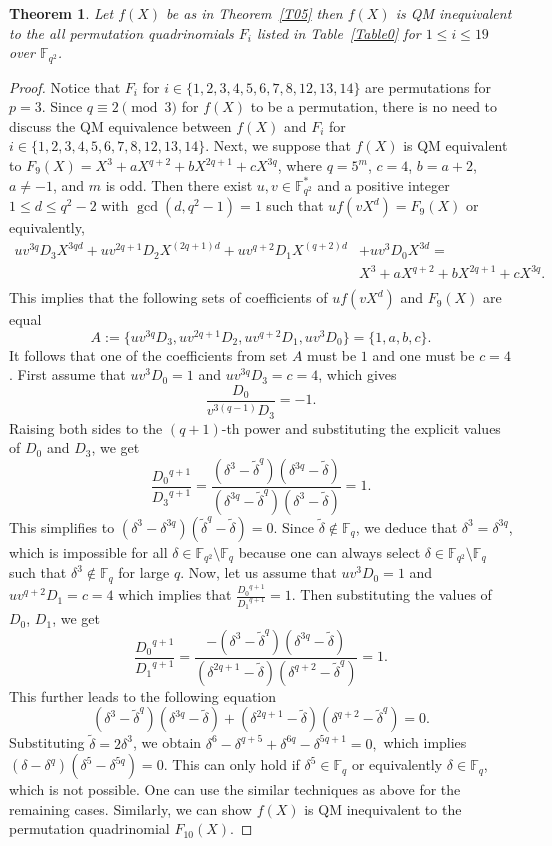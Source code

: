 \documentclass[12pt]{amsart}
\newtheorem{thm}{Theorem}[section]
\numberwithin{equation}{section}
\theoremstyle{definition}
\newcommand{\F}{\mathbb F}
\begin{document}
\begin{thm}\label{quadeq1}
Let $f(X)$ be as in Theorem~\ref{T05} then $f(X)$ is QM inequivalent to the all permutation quadrinomials $F_i$ listed in Table~\ref{Table0} for $1 \leq i \leq 19$ over $\F_{q^2}$.
\end{thm}
\begin{proof}
Notice that $F_i$ for $i \in \{1,2,3,4,5,6,7,8,12,13,14 \}$ are permutations for $p=3$. Since $q \equiv 2 \pmod 3$ for $f(X)$ to be a permutation, there is no need to discuss the QM equivalence between $f(X)$ and $F_i$ for $i \in \{1,2,3,4,5,6,7,8,12,13,14 \}$. Next, we suppose that $f(X)$ is QM equivalent to $F_9(X)=X^3 + aX^{q+2} + bX^{2q+1} + cX^{3q}$, where $q = 5^m$, $c = 4$, $b = a+2$, $a \neq -1$, and $m$ is odd. Then there exist $u, v \in \mathbb{F}_{q^2}^{*}$ and a positive integer $1 \leq d \leq q^2 - 2$ with $\gcd(d, q^2 - 1) = 1$ such that
$uf(vX^d) = F_9(X)$
or equivalently,
\begin{align*}
 uv^{3q}D_3X^{3qd} + uv^{2q+1}D_2X^{(2q+1)d} + uv^{q+2}D_1X^{(q+2)d}&  + uv^3 D_0X^{3d} = \\
& X^3 + aX^{q+2} + bX^{2q+1} + cX^{3q}.\\
\end{align*}
This implies that the following sets of coefficients of $uf(vX^d)$ and $F_9(X)$ are equal
\[
    A := \{uv^{3q}D_3, uv^{2q+1}D_2, uv^{q+2}D_1, uv^3 D_0\} = \{1, a, b, c\} .
\]
It follows that one of the coefficients from set $A$ must be $1$ and one must be $c=4$. First assume that $uv^3 D_0 = 1$ and $uv^{3q}D_3 = c = 4$, which gives
\[
    \frac{D_0}{v^{3(q-1)}D_3} = -1.
\]
Raising both sides to the $(q+1)$-th power and substituting the explicit values of $D_0$ and $D_3$, we get
\[
    \frac{{D_0}^{q+1}}{{D_3}^{q+1}} = \frac{(\delta^3 - \tilde{\delta}^q)(\delta^{3q} - \tilde{\delta})}{(\delta^{3q} - \tilde{\delta}^q)(\delta^3 - \tilde{\delta})}  = 1.
\]
This simplifies to $(\delta^3 - \delta^{3q})(\tilde{\delta}^q - \tilde{\delta}) = 0$. Since $\tilde{\delta} \notin \mathbb{F}_q$, we deduce that $\delta^3 = \delta^{3q}$, which is impossible for all $\delta \in \mathbb{F}_{q^2} \setminus \mathbb{F}_q$ because one can always select $\delta \in \mathbb{F}_{q^2} \setminus \mathbb{F}_q$ such that $\delta^3 \notin \mathbb{F}_q$ for large $q$. Now, let us assume that $uv^3 D_0=1$ and $uv^{q+2}D_1=c=4$ which implies that $\frac{{D_0}^{q+1}}{{D_1}^{q+1}}=1$. Then substituting the values of $D_0$, $D_1$, we get
 \[
 \frac{{D_0}^{q+1}}{{D_1}^{q+1}}=\dfrac{-(\delta^{3}-{\tilde \delta}^q)(\delta^{3q}-{\tilde \delta})}{(\delta^{2q+1}-{\tilde \delta})(\delta^{q+2}-{\tilde \delta}^q)}=1.
 \]
This further leads to the following equation
 \[
 (\delta^{3}-{\tilde \delta}^q)(\delta^{3q}-{\tilde \delta})+(\delta^{2q+1}-{\tilde \delta})(\delta^{q+2}-{\tilde \delta}^q)=0.
 \]
Substituting  ${\tilde \delta}=2\delta^3$, we obtain
 \(
 \delta^6-\delta^{q+5}+\delta^{6q}-\delta^{5q+1}=0,
 \)
 which implies $(\delta-\delta^q)(\delta^5-\delta^{5q})=0$. This can only hold if $\delta^5 \in \F_q$ or equivalently $\delta \in \F_q$, which is not possible. One can use the similar techniques as above for the remaining cases. Similarly, we can show $f(X)$ is QM inequivalent to the permutation quadrinomial $F_{10}(X)$. 
 

\end{proof}
\end{document}
